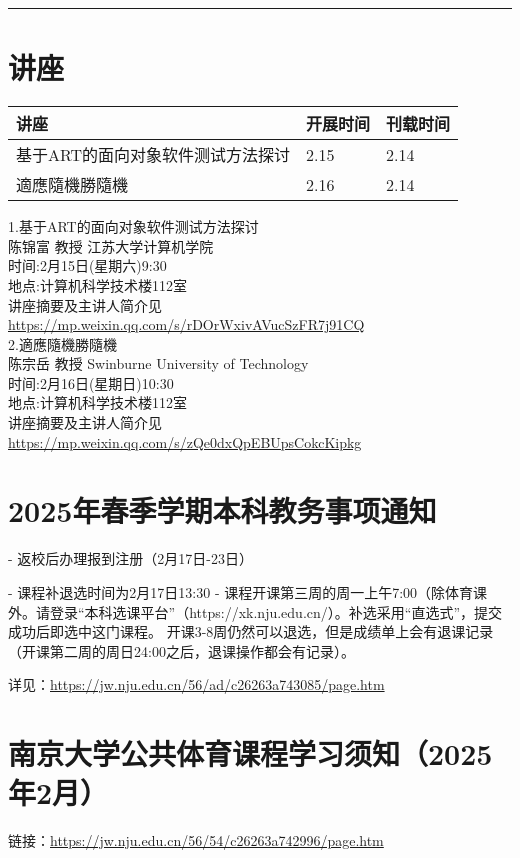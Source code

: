 \documentclass[letterpaper, 12pt]{article}
\begin{document}
\hrule
\pagebreak
\begin{multicols}{2}

\section{讲座}
\begin{tabularx}{0.5\textwidth}{|X|X|X|}
    \hline
    讲座 & 开展时间 & 刊载时间\\
    \hline\hline
基于ART的面向对象软件测试方法探讨 & 2.15 & 2.14\\\hline
適應隨機勝隨機 & 2.16 & 2.14\\\hline
\end{tabularx}

1.基于ART的面向对象软件测试方法探讨\\
陈锦富 教授 江苏大学计算机学院\\
时间:2月15日(星期六)9:30\\
地点:计算机科学技术楼112室\\
讲座摘要及主讲人简介见\url{https://mp.weixin.qq.com/s/rDOrWxivAVucSzFR7j91CQ}\\

2.適應隨機勝隨機\\
陈宗岳 教授 Swinburne University of Technology\\
时间:2月16日(星期日)10:30\\
地点:计算机科学技术楼112室\\
讲座摘要及主讲人简介见\url{https://mp.weixin.qq.com/s/zQe0dxQpEBUpsCokcKipkg}\\
\section{2025年春季学期本科教务事项通知}


- 返校后办理报到注册（2月17日-23日）

- 课程补退选时间为2月17日13:30  - 课程开课第三周的周一上午7:00（除体育课外。请登录“本科选课平台”（https://xk.nju.edu.cn/）。补选采用“直选式”，提交成功后即选中这门课程。 开课3-8周仍然可以退选，但是成绩单上会有退课记录（开课第二周的周日24:00之后，退课操作都会有记录）。 

详见：\url{https://jw.nju.edu.cn/56/ad/c26263a743085/page.htm}\\
\section{南京大学公共体育课程学习须知（2025年2月）}
链接：\url{https://jw.nju.edu.cn/56/54/c26263a742996/page.htm}\\


\end{multicols}
\end{document}

